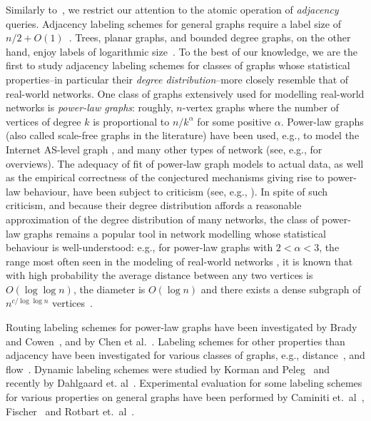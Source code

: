 Similarly to~\cite{}, we restrict our attention to the atomic operation of \emph{adjacency} queries. 
Adjacency labeling schemes for general graphs  require a label size of $n/2+O(1)$~\cite{moon1965minimal, alstrup2014adjacency}.
Trees, planar graphs, and bounded degree graphs, on the other hand,   enjoy labels of logarithmic size~\cite{Alstrup02, gavoille2007shorter, adjiashvili2014labeling}. To the best of our knowledge, we are the first to study adjacency labeling schemes for classes of graphs whose statistical properties--in particular their \emph{degree distribution}--more closely resemble that of real-world networks.
One class of graphs extensively used for modelling real-world networks is \emph{power-law graphs}: roughly, $n$-vertex graphs where the number of vertices of degree $k$ is proportional to $n/k^{\alpha}$ for some positive $\alpha$. Power-law graphs (also called scale-free graphs in the literature) have been used, e.g., to model the Internet AS-level graph \cite{DBLP:journals/ton/SiganosFFF03,DBLP:conf/podc/AkellaCKS03}, and many other types of network (see, e.g., \cite{mitzenmacher2004brief,clauset2009power} for overviews). 
The adequacy of fit of power-law graph models to actual data, as well as the empirical correctness of the conjectured mechanisms giving rise to power-law behaviour, have been subject to criticism (see, e.g., \cite{DBLP:journals/jacm/AchlioptasCKM09,clauset2009power}). 
In spite of such criticism, and because their degree distribution affords a reasonable approximation of the degree distribution of many networks, the class of power-law graphs remains a popular tool in network modelling whose statistical behaviour is well-understood: e.g., for power-law graphs with $2<\alpha<3$, the range most often seen in the modeling of real-world networks \cite{clauset2009power}, it is known that with high probability the average distance between any two vertices is  $O(\log \log n)$, the diameter is $O(\log n)$ and there exists a dense subgraph of $n^{c/\log \log n}$ vertices~\cite{chung2004average}. 

Routing labeling schemes for power-law graphs  have been investigated by Brady and Cowen~\cite{brady2006compact}, and by Chen et al.~\cite{chen2012compact}. Labeling schemes for other properties than adjacency have been investigated for various classes of graphs, e.g., distance~\cite{gavoillea2004distance}, and flow~\cite{katz2004labeling}. 
Dynamic labeling schemes were studied by Korman and Peleg~\cite{korman2007compact,Korman07,korman2007general} and recently by Dahlgaard et. al~\cite{dahlgaard2014dynamic}.
Experimental evaluation for some labeling schemes for various properties on general graphs have been performed by Caminiti et.~al~\cite{caminiti2008engineering}, Fischer~\cite{fischer2009short} and Rotbart et.~al~\cite{rotbart2014evaluation}.

